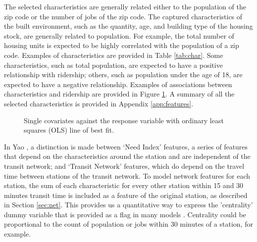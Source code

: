 \documentclass[11pt]{article}
\begin{document}
The selected characteristics are generally related either to the population of the zip code or the number of jobs of the zip code. The captured characteristics of the built environment, such as the quantity, age, and building type of the housing stock, are generally related to population. For example, the total number of housing units is expected to be highly correlated with the population of a zip code.  Examples of characteristics are provided in Table \ref{tab:char}. Some characteristics, such as total population, are expected to have a positive relationship with ridership; others, such as population under the age of 18, are expected to have a negative relationship. Examples of associations between characteristics and ridership are provided in Figure \ref{fig:chartypes}. A summary of all the selected characteristics is provided in Appendix \ref{app:features}.



\begin{figure}[H]
\centering
{}
\caption{Single covariates against the response variable with ordinary least squares (OLS) line of best fit.}\label{fig:chartypes}
\end{figure}


In Yao \cite{Yao2007}, a distinction is made between `Need Index' features, a series of features that depend on the characteristics around the station and are independent of the transit network; and `Transit Network' features, which do depend on the travel time between stations of the transit network. To model network features for each station, the sum of each characteristic for every other station within 15 and 30 minutes transit time is included as a feature of the original station, as described in Section \ref{sec:net}. This provides us a quantitative way to express the 'centrality' dummy variable that is provided as a flag in many models \cite{Kuby2004, Durning2015}. Centrality could be proportional to the count of population or jobs within 30 minutes of a station, for example. 
\end{document}
